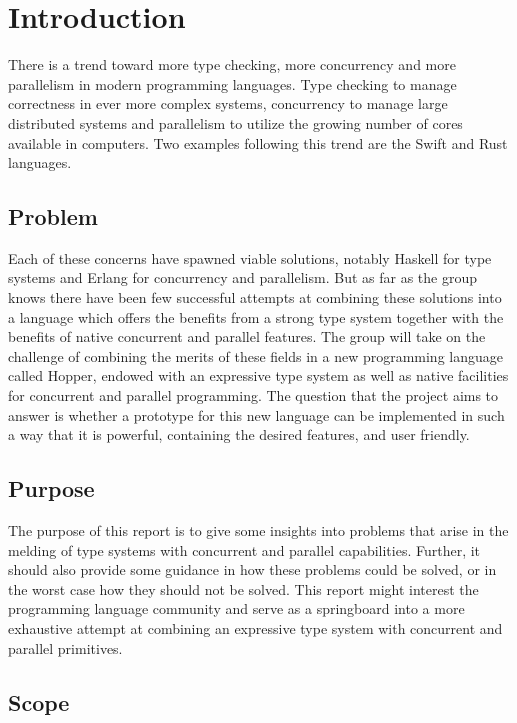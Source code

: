 \chapter{Introduction}

There is a trend toward more type checking, more concurrency and more parallelism in modern programming languages. Type checking to manage correctness in ever more complex systems, concurrency to manage large distributed systems and parallelism to utilize the growing number of cores available in computers. Two examples following this trend are the Swift\cite{swift} and Rust\cite{rust} languages.

\section{Problem}

Each of these concerns have spawned viable solutions, notably Haskell\cite{haskell} for type systems and Erlang\cite{erlang} for concurrency and parallelism. But as far as the group knows there have been few successful attempts at combining these solutions into a language which offers the benefits from a strong type system together with the benefits of native concurrent and parallel features. The group will take on the challenge of combining the merits of these fields in a new programming language called Hopper, endowed with an expressive type system as well as native facilities for concurrent and parallel programming. The question that the project aims to answer is whether a prototype for this new language can be implemented in such a way that it is powerful, containing the desired features, and user friendly.

\section{Purpose}

The purpose of this report is to give some insights into problems that arise in the melding of type systems with concurrent and parallel capabilities. Further, it should also provide some guidance in how these problems could be solved, or in the worst case how they should not be solved. This report might interest the programming language community and serve as a springboard into a more exhaustive attempt at combining an expressive type system with concurrent and parallel primitives.

\section{Scope}

